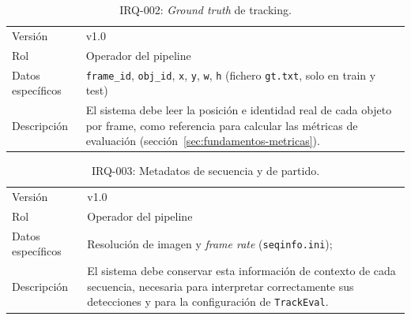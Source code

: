 \begin{table}[htp]
\centering
\caption{IRQ-002: \emph{Ground truth} de tracking.}
\label{tab:irq-002}
\renewcommand{\arraystretch}{1.2}
\begin{tabular}{|p{3.1cm}|p{9.2cm}|}
\hline
\rowcolor{gray!25}
\multicolumn{2}{|l|}{\textbf{IRQ-002 -- \emph{Ground truth} de tracking}} \\
\hline
Versión & v1.0 \\
\hline
Rol & Operador del pipeline \\
\hline
Datos específicos & \texttt{frame\_id}, \texttt{obj\_id}, \texttt{x},
  \texttt{y}, \texttt{w}, \texttt{h} (fichero \texttt{gt.txt}, solo en
  train y test) \\
\hline
Descripción & El sistema debe leer la posición e identidad real de cada
  objeto por frame, como referencia para calcular las métricas de
  evaluación (sección~\ref{sec:fundamentos-metricas}). \\
\hline
\end{tabular}
\end{table}

\begin{table}[htp]
\centering
\caption{IRQ-003: Metadatos de secuencia y de partido.}
\label{tab:irq-003}
\renewcommand{\arraystretch}{1.2}
\begin{tabular}{|p{3.1cm}|p{9.2cm}|}
\hline
\rowcolor{gray!25}
\multicolumn{2}{|l|}{\textbf{IRQ-003 -- Metadatos de secuencia y de partido}} \\
\hline
Versión & v1.0 \\
\hline
Rol & Operador del pipeline \\
\hline
Datos específicos & Resolución de imagen y \emph{frame rate}
  (\texttt{seqinfo.ini}); \\
\hline
Descripción & El sistema debe conservar esta información de contexto de
  cada secuencia, necesaria para interpretar correctamente sus detecciones
  y para la configuración de \texttt{TrackEval}. \\
\hline
\end{tabular}
\end{table}

